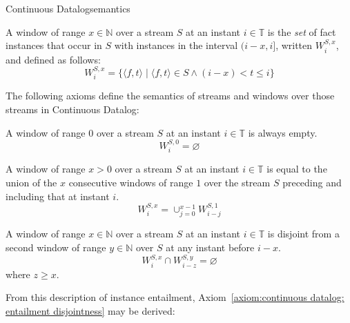 \begin{nestedsection}{Continuous Datalog}{semantics}
\begin{definition}[Window]

A window of range ${x \in \mathbb{N}}$ over a stream $S$ at an instant
${i \in \mathbb{T}}$ is the \emph{set} of fact instances that occur in
$S$ with instances in the interval ${(i-x,i]}$, written
  ${W^{S,x}_{i}}$, and defined as follows:
\[ W^{S,x}_i = \{ \langle f, t \rangle \mid \langle f, t \rangle \in S \land (i-x) < t \leqslant i \}\]  
\end{definition}

The following axioms define the semantics of streams and windows over
those streams in Continuous Datalog:

\begin{axiom}\label{axiom:continuous datalog: window range leq 0}
A window of range $0$ over a stream $S$ at an instant 
${i \in \mathbb{T}}$ is always empty.
\begin{equation*}
W^{S,0}_{i} = \varnothing
\end{equation*}
\end{axiom}

\begin{axiom}\label{axiom:continuous datalog: window composition}
A window of range ${x > 0}$ over a stream $S$ at an instant 
${i \in \mathbb{T}}$ is equal to the union of the $x$ consecutive
windows of range $1$ over the stream $S$ preceding and including that at
instant $i$.
\begin{equation*}
W^{S,x}_{i} = \mathop{\cup}_{j=0}^{x-1} W^{S,1}_{i-j}
\end{equation*}
\end{axiom}

\begin{axiom}\label{axiom:continuous datalog: window disjointness}
A window of range ${x \in \mathbb{N}}$ over a stream $S$ at an
instant ${i \in \mathbb{T}}$ is disjoint from a second window of 
range ${y \in \mathbb{N}}$ over $S$ at any instant before $i - x$.
\begin{equation*}
W^{S,x}_{i} \cap W^{S,y}_{i-z} = \varnothing
\end{equation*}
where $z \geq x$.
\end{axiom}


From this description of instance entailment,
Axiom~\ref{axiom:continuous datalog: entailment disjointness} may be
derived:



\end{nestedsection}
